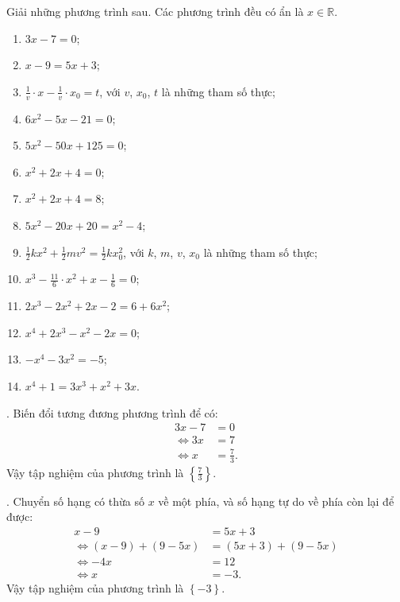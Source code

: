 \exercise Giải những phương trình sau. Các phương trình đều có ẩn là $x \in \mathbb{R}$.
\begin{multicols}{2}
   \begin{enumerate}
      \item $3x - 7 = 0$;
      \item $x - 9 = 5x + 3$;
      \item $\frac{1}{v}\cdot x - \frac{1}{v} \cdot x_0 = t$, với $v$, $x_0$, $t$ là những tham số thực;
      \item $6x^2 - 5x - 21 = 0$;
      \item $5x^2 - 50x + 125 = 0$;
      \item $x^2 + 2x + 4 = 0$;
      \item $x^2 + 2x + 4 = 8$;
      \item $5x^2 - 20x + 20 = x^2 - 4$;
      \item $\frac{1}{2}kx^2 + \frac{1}{2}mv^2 = \frac{1}{2}kx_0^2$, với $k$, $m$, $v$, $x_0$ là những tham số thực;
      \item $x^3 - \frac{11}{6}\cdot x^2 + x - \frac{1}{6} = 0$;
      \item $2x^3 - 2x^2 + 2x - 2 = 6 + 6x^2$;
      \item $x^4+2x^3-x^2-2x=0$;
      \item $-x^4 -3x^2 = -5$;
      \item $x^4 + 1 = 3x^3 + x^2 + 3x$.
   \end{enumerate}
\end{multicols}

\solution

\setcounter{subexercise}{1}
. Biến đổi tương đương phương trình để có:
\begin{align*}
   3x - 7 &= 0 \\
   \iff 3x &= 7\\
   \iff x &= \frac{7}{3}.
\end{align*}
Vậy tập nghiệm của phương trình là $\displaystyle\left\{\frac{7}{3}\right\}$.

. Chuyển số hạng có thừa số $x$ về một phía, và số hạng tự do về phía còn lại để được:
\begin{align*}
   x - 9 &= 5x + 3 \\
   \iff (x - 9) + (9 - 5x) &= (5x + 3) + (9 - 5x) \\ 
   \iff -4x &= 12 \\
   \iff x &= -3.
\end{align*}
Vậy tập nghiệm của phương trình là $\displaystyle\left\{-3\right\}$.


